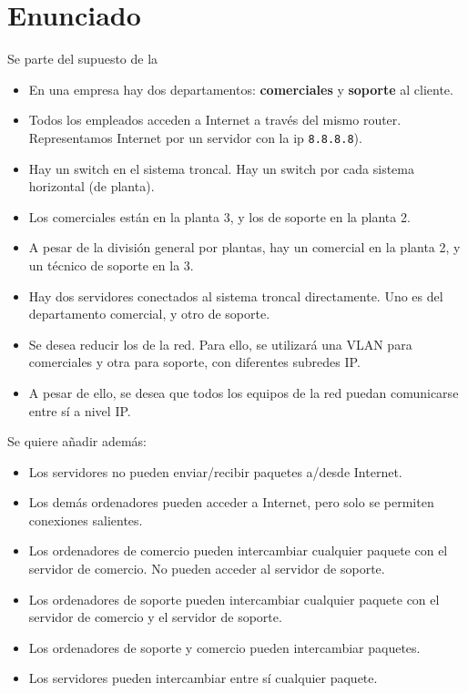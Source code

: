 \section{Enunciado}
Se parte del supuesto de la 
\begin{itemize}
\item En una empresa hay dos departamentos: \textbf{comerciales} y \textbf{soporte} al cliente.
\item Todos los empleados acceden a Internet a través del mismo router. Representamos Internet por un servidor con la ip \texttt{8.8.8.8}).
\item Hay un switch en el sistema troncal. Hay un switch por cada sistema horizontal (de planta).  
\item Los comerciales están en la planta 3, y los de soporte en la planta 2.
\item A pesar de la división general por plantas, hay un comercial en la planta 2, y un técnico de soporte en la 3.
\item Hay dos servidores conectados al sistema troncal directamente. Uno es del departamento comercial, y otro de soporte.
\item Se desea reducir los  de la red. Para ello, se utilizará una VLAN para comerciales y otra para soporte, con diferentes subredes IP.
\item A pesar de ello, se desea que todos los equipos de la red puedan comunicarse entre sí a nivel IP.
\end{itemize}

Se quiere añadir además:
\begin{itemize}
\item Los servidores no pueden enviar/recibir paquetes a/desde Internet.
\item Los demás ordenadores pueden acceder a Internet, pero solo se permiten conexiones salientes.
\item Los ordenadores de comercio pueden intercambiar cualquier paquete con el servidor de comercio. No pueden acceder al servidor de soporte.
\item Los ordenadores de soporte pueden intercambiar cualquier paquete con el servidor de comercio y el servidor de soporte.
\item Los ordenadores de soporte y comercio pueden intercambiar paquetes.
\item Los servidores pueden intercambiar entre sí cualquier paquete.
\end{itemize}


